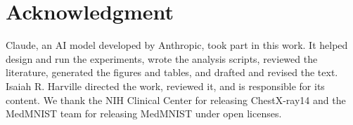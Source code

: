 \documentclass[conference]{IEEEtran}
\newif\ifanycitation
\begin{document}
\section*{Acknowledgment}

Claude, an AI model developed by Anthropic, took part in this work. It helped design and
run the experiments, wrote the analysis scripts, reviewed the literature, generated the
figures and tables, and drafted and revised the text. Isaiah R. Harville directed the
work, reviewed it, and is responsible for its content. We thank the NIH Clinical Center
for releasing ChestX-ray14 and the MedMNIST team for releasing MedMNIST under open
licenses.

\ifanycitation


\fi
\end{document}
